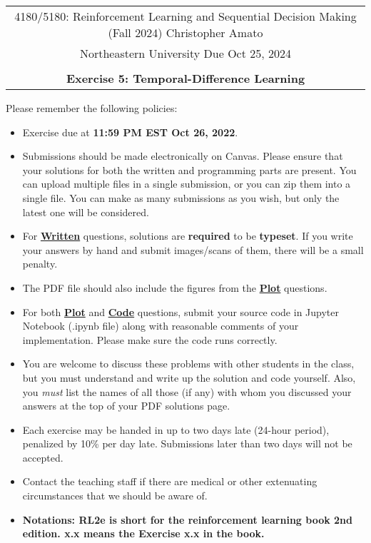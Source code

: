 \documentclass{article}
\begin{document}
\begin{center}
	\begin{tabular}{|c|}
		\hline
		4180/5180: Reinforcement Learning and Sequential Decision Making (Fall 2024) \hspace{1cm} Christopher Amato \\
		Northeastern University \hfill  Due Oct 25, 2024                                                    \\\\
		{\bfseries \large Exercise 5: Temporal-Difference Learning}                                    \\ \hline
	\end{tabular}
\end{center}


Please remember the following policies:
\begin{itemize}
	\item Exercise due at \textbf{11:59 PM EST Oct 26, 2022}.
	\item Submissions should be made electronically on Canvas. Please ensure that your solutions for both the written and programming parts are present. You can upload multiple files in a single submission, or you can zip them into a single file. You can make as many submissions as you wish, but only the latest one will be considered.
	\item For \uline{\textbf{Written}} questions, solutions are \textbf{required} to be \textbf{typeset}. If you write your answers by hand and submit images/scans of them, there will be a small penalty.
	\item The PDF file should also include the figures from the \uline{\textbf{Plot}} questions.
	\item For both \uline{\textbf{Plot}} and \uline{\textbf{Code}} questions, submit your source code in Jupyter Notebook (.ipynb file) along with reasonable comments of your implementation. Please make sure the code runs correctly. 
	\item You are welcome to discuss these problems with other students in the class, but you must understand and write up the solution and code yourself. Also, you \textit{must} list the names of all those (if any) with whom you discussed your answers at the top of your PDF solutions page.
	\item Each exercise may be handed in up to two days late (24-hour period), penalized by 10\% per day late. Submissions later than two days will not be accepted.
	\item Contact the teaching staff if there are medical or other extenuating circumstances that we should be aware of.
	\item \textbf{Notations: RL2e is short for the reinforcement learning book 2nd edition. x.x means the Exercise x.x in the book.}
\end{itemize}
\end{document}
